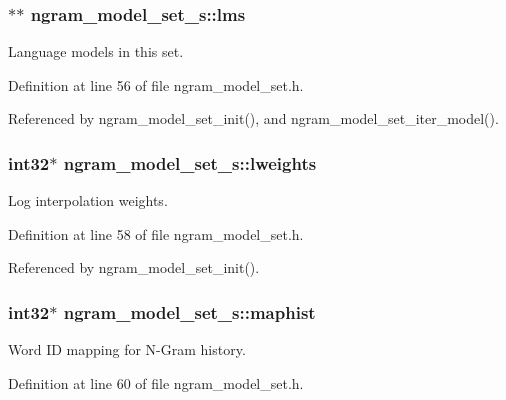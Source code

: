 \subsubsection[{lms}]{$\ast$$\ast$ {\bf ngram\-\_\-model\-\_\-set\-\_\-s\-::lms}}\label{structngram__model__set__s_a862d4c4feb5a903101f4a0fdc5ba8a62}


\-Language models in this set. 



\-Definition at line 56 of file ngram\-\_\-model\-\_\-set.\-h.



\-Referenced by ngram\-\_\-model\-\_\-set\-\_\-init(), and ngram\-\_\-model\-\_\-set\-\_\-iter\-\_\-model().

\subsubsection[{lweights}]{\setlength{\rightskip}{0pt plus 5cm}int32$\ast$ {\bf ngram\-\_\-model\-\_\-set\-\_\-s\-::lweights}}\label{structngram__model__set__s_a11068bb0029c788c506bec4507dd6d23}


\-Log interpolation weights. 



\-Definition at line 58 of file ngram\-\_\-model\-\_\-set.\-h.



\-Referenced by ngram\-\_\-model\-\_\-set\-\_\-init().

\subsubsection[{maphist}]{\setlength{\rightskip}{0pt plus 5cm}int32$\ast$ {\bf ngram\-\_\-model\-\_\-set\-\_\-s\-::maphist}}\label{structngram__model__set__s_af34ca232338c2d8c7dc8d13869ac09fd}


\-Word \-I\-D mapping for \-N-\/\-Gram history. 



\-Definition at line 60 of file ngram\-\_\-model\-\_\-set.\-h.



